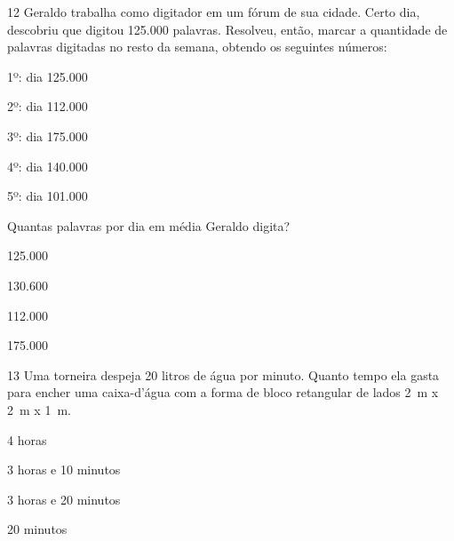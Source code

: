 



\num{12} Geraldo trabalha como digitador em um fórum de sua cidade. Certo
dia, descobriu que digitou 125.000 palavras. Resolveu, então, marcar a
quantidade de palavras digitadas no resto da semana, obtendo os
seguintes números:

1º: dia 125.000

2º: dia 112.000

3º: dia 175.000

4º: dia 140.000

5º: dia 101.000

Quantas palavras por dia em média Geraldo digita?

\begin{escolha}
\item 125.000
\item 130.600
\item 112.000
\item 175.000
\end{escolha}








\num{13} Uma torneira despeja 20 litros de água por minuto. Quanto tempo ela
gasta para encher uma caixa-d'água com a forma de bloco retangular de
lados 2~m x 2~m x 1~m.


\begin{escolha}
\item 4 horas
\item 3 horas e 10 minutos
\item 3 horas e 20 minutos
\item 20 minutos
\end{escolha}

